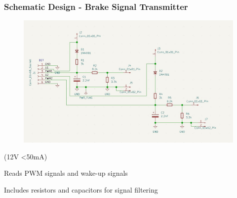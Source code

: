 \documentclass[8pt,compress]{beamer}
\begin{document}
\begin{frame}
  \frametitle{Schematic Design - Brake Signal Transmitter  }
  \begin{minipage}{0.6\textwidth}
    \begin{figure}
      \includegraphics[width=\textwidth]{assets/electronic/bst_schem.jpg}
    \end{figure}
  \end{minipage}
  \hfill
  \begin{minipage}{0.375\textwidth}
    \begin{itemize}
      \begin{block}{(12V <50mA)}
        \item Reads PWM signals and wake-up signals
        \item Includes resistors and capacitors for signal filtering
      \end{block}
    \end{itemize}
  \end{minipage}
\end{frame}
\end{document}
